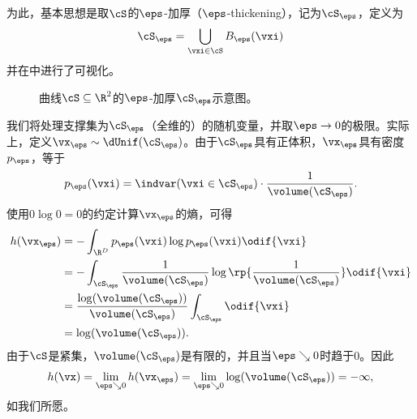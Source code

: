 \documentclass[../../book-main_zh.tex]{subfiles}
\begin{document}
为此，基本思想是取\(\cS\)的\(\eps\)-加厚（\(\eps\)-thickening），记为\(\cS_{\eps}\)，定义为
\begin{equation}
    \cS_{\eps} = \bigcup_{\vxi \in \cS}B_{\eps}(\vxi)
\end{equation}
并在中进行了可视化。
\begin{figure}[th]
    \centering
    \caption{曲线\(\cS \subseteq \R^{2}\)的\(\eps\)-加厚\(\cS_\eps\)示意图。}
    \label{fig:entropy_eps_thickening}
\end{figure}
我们将处理支撑集为\(\cS_{\eps}\)（全维的）的随机变量，并取\(\eps \to 0\)的极限。实际上，定义\(\vx_{\eps} \sim \dUnif(\cS_{\eps})\)。由于\(\cS_{\eps}\)具有正体积，\(\vx_{\eps}\)具有密度\(p_{\eps}\)，等于
\begin{equation}
    p_{\eps}(\vxi) = \indvar(\vxi \in \cS_{\eps}) \cdot
    \frac{1}{\volume(\cS_{\eps})}.
\end{equation}
使用\(0 \log 0 = 0\)的约定计算\(\vx_{\eps}\)的熵，可得
\begin{align}
    h(\vx_{\eps})
    &= -\int_{\R^{D}}p_{\eps}(\vxi)\log p_{\eps}(\vxi)\odif{\vxi} \\
    &= -\int_{\cS_{\eps}}\frac{1}{\volume(\cS_{\eps})}
    \log\rp{\frac{1}{\volume(\cS_{\eps})}}\odif{\vxi} \\
    &=
    \frac{\log(\volume(\cS_{\eps}))}{\volume(\cS_{\eps})}\int_{\cS_{\eps}}\odif{\vxi}
    \\
    &= \log(\volume(\cS_{\eps})).
\end{align}
由于\(\cS\)是紧集，\(\volume(\cS_{\eps})\)是有限的，并且当\(\eps \searrow 0\)时趋于\(0\)。因此
\begin{equation}
    h(\vx) = \lim_{\eps \searrow 0}h(\vx_{\eps}) = \lim_{\eps
    \searrow 0}\log(\volume(\cS_{\eps})) = -\infty,
\end{equation}
如我们所愿。
\end{document}
